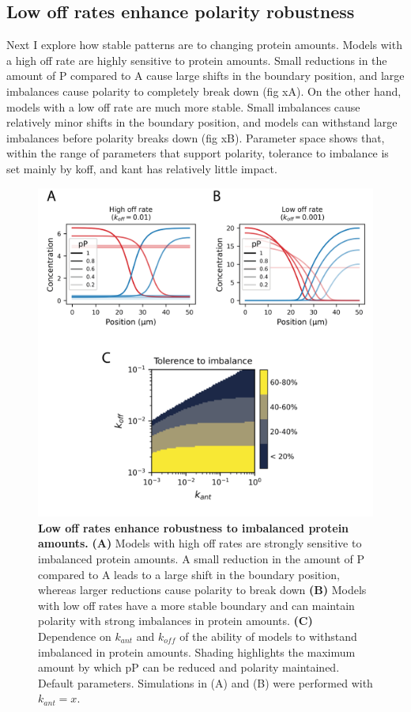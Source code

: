 \documentclass[12pt]{"report"}
\newcommand{\mycaption}[2]{\caption[#1]{\textbf{#1.} #2}}
\begin{document}
\clearpage
\subsection{Low off rates enhance polarity robustness}

Next I explore how stable patterns are to changing protein amounts. Models with a high off rate are highly sensitive to protein amounts. Small reductions in the amount of P compared to A cause large shifts in the boundary position, and large imbalances cause polarity to completely break down (fig xA). On the other hand, models with a low off rate are much more stable. Small imbalances cause relatively minor shifts in the boundary position, and models can withstand large imbalances before polarity breaks down (fig xB). Parameter space shows that, within the range of parameters that support polarity, tolerance to imbalance is set mainly by koff, and kant has relatively little impact.\\

\begin{figure}
\includegraphics[scale=1]{goehring_model_kant_koff_dosage_imbalance}
\centering
\mycaption{Low off rates enhance robustness to imbalanced protein amounts}{
\textbf{(A)} Models with high off rates are strongly sensitive to imbalanced protein amounts. A small reduction in the amount of P compared to A leads to a large shift in the boundary position, whereas larger reductions cause polarity to break down
\textbf{(B)} Models with low off rates have a more stable boundary and can maintain polarity with strong imbalances in protein amounts. 
\textbf{(C)} Dependence on $k_{ant}$ and $k_{off}$ of the ability of models to withstand imbalanced in protein amounts. Shading highlights the maximum amount by which pP can be reduced and polarity maintained. Default parameters. Simulations in (A) and (B) were performed with $k_{ant} = x$.
}
\label{fig:goehring_model_kant_koff_dosage_imbalance}
\end{figure}
\end{document}
